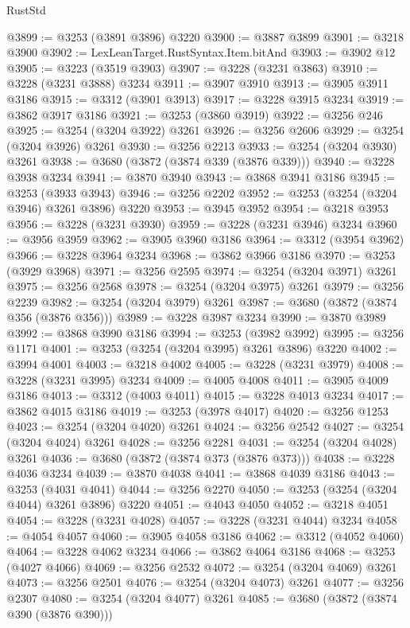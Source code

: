 \begin{lexlean}{RustStd}
\begin{coremodule}
{\begin{coremodule}
{{{{{{{{{{{{{{{{{{{{{{{{{{{{{{{{{{{{{@3899 := @3253 (@3891 @3896) @3220
@3900 := @3887 @3899
@3901 := @3218 @3900
@3902 := LexLeanTarget.RustSyntax.Item.bitAnd
@3903 := @3902 @12
@3905 := @3223 (@3519 @3903)
@3907 := @3228 (@3231 @3863)
@3910 := @3228 (@3231 @3888) @3234
@3911 := @3907 @3910
@3913 := @3905 @3911 @3186
@3915 := @3312 (@3901 @3913)
@3917 := @3228 @3915 @3234
@3919 := @3862 @3917 @3186
@3921 := @3253 (@3860 @3919)
@3922 := @3256 @246
@3925 := @3254 (@3204 @3922) @3261
@3926 := @3256 @2606
@3929 := @3254 (@3204 @3926) @3261
@3930 := @3256 @2213
@3933 := @3254 (@3204 @3930) @3261
@3938 := @3680 (@3872 (@3874 @339 (@3876 @339)))
@3940 := @3228 @3938 @3234
@3941 := @3870 @3940
@3943 := @3868 @3941 @3186
@3945 := @3253 (@3933 @3943)
@3946 := @3256 @2202
@3952 := @3253 (@3254 (@3204 @3946) @3261 @3896) @3220
@3953 := @3945 @3952
@3954 := @3218 @3953
@3956 := @3228 (@3231 @3930)
@3959 := @3228 (@3231 @3946) @3234
@3960 := @3956 @3959
@3962 := @3905 @3960 @3186
@3964 := @3312 (@3954 @3962)
@3966 := @3228 @3964 @3234
@3968 := @3862 @3966 @3186
@3970 := @3253 (@3929 @3968)
@3971 := @3256 @2595
@3974 := @3254 (@3204 @3971) @3261
@3975 := @3256 @2568
@3978 := @3254 (@3204 @3975) @3261
@3979 := @3256 @2239
@3982 := @3254 (@3204 @3979) @3261
@3987 := @3680 (@3872 (@3874 @356 (@3876 @356)))
@3989 := @3228 @3987 @3234
@3990 := @3870 @3989
@3992 := @3868 @3990 @3186
@3994 := @3253 (@3982 @3992)
@3995 := @3256 @1171
@4001 := @3253 (@3254 (@3204 @3995) @3261 @3896) @3220
@4002 := @3994 @4001
@4003 := @3218 @4002
@4005 := @3228 (@3231 @3979)
@4008 := @3228 (@3231 @3995) @3234
@4009 := @4005 @4008
@4011 := @3905 @4009 @3186
@4013 := @3312 (@4003 @4011)
@4015 := @3228 @4013 @3234
@4017 := @3862 @4015 @3186
@4019 := @3253 (@3978 @4017)
@4020 := @3256 @1253
@4023 := @3254 (@3204 @4020) @3261
@4024 := @3256 @2542
@4027 := @3254 (@3204 @4024) @3261
@4028 := @3256 @2281
@4031 := @3254 (@3204 @4028) @3261
@4036 := @3680 (@3872 (@3874 @373 (@3876 @373)))
@4038 := @3228 @4036 @3234
@4039 := @3870 @4038
@4041 := @3868 @4039 @3186
@4043 := @3253 (@4031 @4041)
@4044 := @3256 @2270
@4050 := @3253 (@3254 (@3204 @4044) @3261 @3896) @3220
@4051 := @4043 @4050
@4052 := @3218 @4051
@4054 := @3228 (@3231 @4028)
@4057 := @3228 (@3231 @4044) @3234
@4058 := @4054 @4057
@4060 := @3905 @4058 @3186
@4062 := @3312 (@4052 @4060)
@4064 := @3228 @4062 @3234
@4066 := @3862 @4064 @3186
@4068 := @3253 (@4027 @4066)
@4069 := @3256 @2532
@4072 := @3254 (@3204 @4069) @3261
@4073 := @3256 @2501
@4076 := @3254 (@3204 @4073) @3261
@4077 := @3256 @2307
@4080 := @3254 (@3204 @4077) @3261
@4085 := @3680 (@3872 (@3874 @390 (@3876 @390)))
}}}}}}}}}}}}}}}}}}}}}}}}}}}}}}}}}}}}}
\end{coremodule}}
\end{coremodule}
\end{lexlean}
